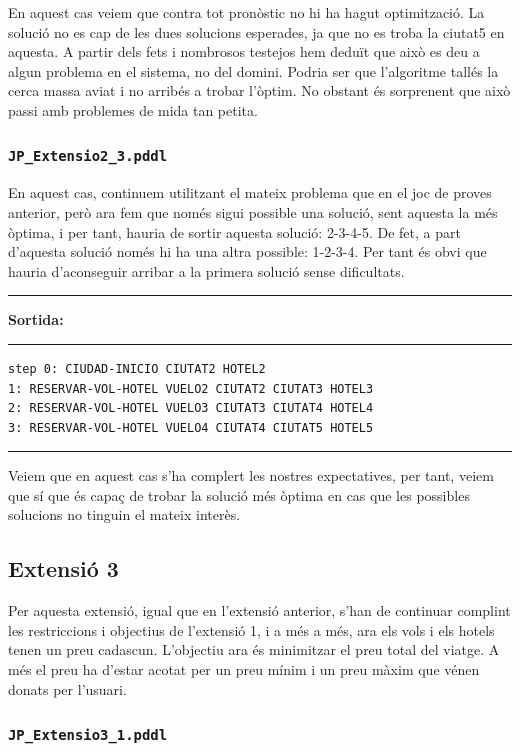 \documentclass[11pt,a4paper]{article}
\begin{document}
En aquest cas veiem que contra tot pronòstic no hi ha hagut optimització. La solució no es cap de les dues solucions esperades, ja que no es troba la ciutat5 en aquesta. A partir dels fets i nombrosos testejos hem deduït que això es deu a algun problema en el sistema, no del domini. Podria ser que l'algoritme tallés la cerca massa aviat i no arribés a trobar l'òptim. No obstant és sorprenent que això passi amb problemes de mida tan petita.

\subsubsection*{\texttt{JP\_Extensio2\_3.pddl}}

En aquest cas, continuem utilitzant el mateix problema que en el joc de proves anterior, però ara fem que només sigui possible una solució, sent aquesta la més òptima, i per tant, hauria de sortir aquesta solució: 2-3-4-5. De fet, a part d'aquesta solució només hi ha una altra possible: 1-2-3-4. Per tant és obvi que hauria d'aconseguir arribar a la primera solució sense dificultats.

\begin{samepage}
\medskip
\noindent
\rule{0.1\textwidth}{0.5mm}
\textbf{Sortida:}
\rule{0.76\textwidth}{0.5mm}
\begin{verbatim}
step 0: CIUDAD-INICIO CIUTAT2 HOTEL2
1: RESERVAR-VOL-HOTEL VUELO2 CIUTAT2 CIUTAT3 HOTEL3
2: RESERVAR-VOL-HOTEL VUELO3 CIUTAT3 CIUTAT4 HOTEL4
3: RESERVAR-VOL-HOTEL VUELO4 CIUTAT4 CIUTAT5 HOTEL5
\end{verbatim}
\rule{\textwidth}{0.5mm}
\medskip
\end{samepage}

Veiem que en aquest cas s'ha complert les nostres expectatives, per tant, veiem que sí que és capaç de trobar la solució més òptima en cas que les possibles solucions no tinguin el mateix interès.


\subsection{Extensió 3}

Per aquesta extensió, igual que en l'extensió anterior, s'han de continuar complint les restriccions i objectius de l'extensió 1, i a més a més, ara els vols i els hotels tenen un preu cadascun.
L'objectiu ara és minimitzar el preu total del viatge. A més el preu ha d'estar acotat per un preu mínim i un preu màxim que vénen donats per l'usuari.

\subsubsection*{\texttt{JP\_Extensio3\_1.pddl}}
\end{document}
